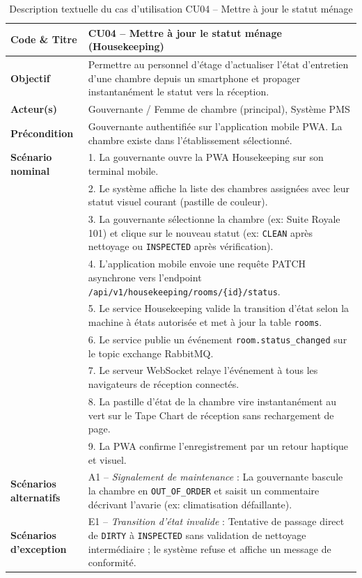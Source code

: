\documentclass[12pt,a4paper,oneside]{report}
\begin{document}
\begin{table}[H]
\centering
\small
\renewcommand{\arraystretch}{1.2}
\begin{tabularx}{\textwidth}{|p{3.5cm}|X|}
\hline
\textbf{Code \& Titre} & \textbf{CU04 -- Mettre à jour le statut ménage (Housekeeping)} \\
\hline
\textbf{Objectif} & Permettre au personnel d'étage d'actualiser l'état d'entretien d'une chambre depuis un smartphone et propager instantanément le statut vers la réception. \\
\hline
\textbf{Acteur(s)} & Gouvernante / Femme de chambre (principal), Système PMS \\
\hline
\textbf{Précondition} & Gouvernante authentifiée sur l'application mobile PWA. La chambre existe dans l'établissement sélectionné. \\
\hline
\textbf{Scénario nominal} & 
1. La gouvernante ouvre la PWA Housekeeping sur son terminal mobile.\\
& 2. Le système affiche la liste des chambres assignées avec leur statut visuel courant (pastille de couleur).\\
& 3. La gouvernante sélectionne la chambre (ex: Suite Royale 101) et clique sur le nouveau statut (ex: \texttt{CLEAN} après nettoyage ou \texttt{INSPECTED} après vérification).\\
& 4. L'application mobile envoie une requête PATCH asynchrone vers l'endpoint \texttt{/api/v1/housekeeping/rooms/\{id\}/status}.\\
& 5. Le service Housekeeping valide la transition d'état selon la machine à états autorisée et met à jour la table \texttt{rooms}.\\
& 6. Le service publie un événement \texttt{room.status\_changed} sur le topic exchange RabbitMQ.\\
& 7. Le serveur WebSocket relaye l'événement à tous les navigateurs de réception connectés.\\
& 8. La pastille d'état de la chambre vire instantanément au vert sur le Tape Chart de réception sans rechargement de page.\\
& 9. La PWA confirme l'enregistrement par un retour haptique et visuel.\\
\hline
\textbf{Scénarios alternatifs} & 
A1 -- \textit{Signalement de maintenance} : La gouvernante bascule la chambre en \texttt{OUT\_OF\_ORDER} et saisit un commentaire décrivant l'avarie (ex: climatisation défaillante).\\
\hline
\textbf{Scénarios d'exception} & 
E1 -- \textit{Transition d'état invalide} : Tentative de passage direct de \texttt{DIRTY} à \texttt{INSPECTED} sans validation de nettoyage intermédiaire ; le système refuse et affiche un message de conformité.\\
\hline
\end{tabularx}
\caption{Description textuelle du cas d'utilisation CU04 -- Mettre à jour le statut ménage}
\label{tab:uc_cu04}
\end{table}
\end{document}
